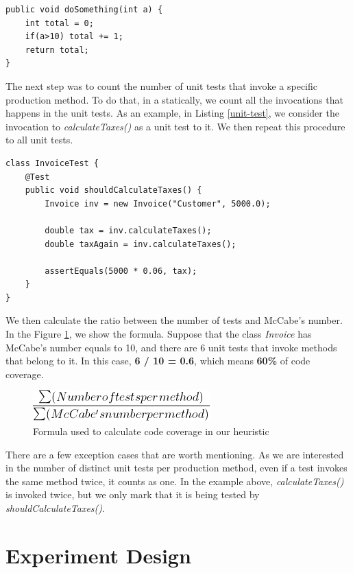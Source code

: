 \documentclass{sig-alternate}
\begin{document}
\begin{lstlisting}
public void doSomething(int a) {
	int total = 0;
	if(a>10) total += 1;
	return total;
}
\end{lstlisting}

The next step was to count the number of unit tests that invoke a specific production method. To do that,
in a statically, we count all the invocations that happens in the unit tests. As an example, in Listing
\ref{unit-test}, we consider the invocation to \textit{calculateTaxes()} as a unit test to it.
We then repeat this procedure to all unit tests.

\begin{lstlisting}
class InvoiceTest {
	@Test
	public void shouldCalculateTaxes() {
		Invoice inv = new Invoice("Customer", 5000.0);

		double tax = inv.calculateTaxes();
		double taxAgain = inv.calculateTaxes();
		
		assertEquals(5000 * 0.06, tax);
	}
}
\end{lstlisting}

We then calculate the ratio between the number of tests and 
McCabe's number. In the Figure \ref{fig:formula}, we show the formula.
Suppose that the class \textit{Invoice} has McCabe's number equals to 10, and there are 6 unit tests
that invoke methods that belong to it.  
In this case, \textbf{6 / 10 = 0.6}, which means \textbf{60\%} of code coverage.


	\begin{figure}[h!H]
	  \centering
	  \includegraphics[scale=0.6]{imgs/formula.png}
	  \caption{Formula used to calculate code coverage in our heuristic}
	  \label{fig:formula}
	\end{figure}


There are a few exception cases that are worth mentioning. 
As we are
interested in the number of distinct unit tests per production method, even if a test invokes the same method twice, it
counts as one. In the example above, \textit{calculateTaxes()} is invoked twice, but we only mark that it is being
tested by \textit{shouldCalculateTaxes()}.

\section{Experiment Design}
\end{document}
